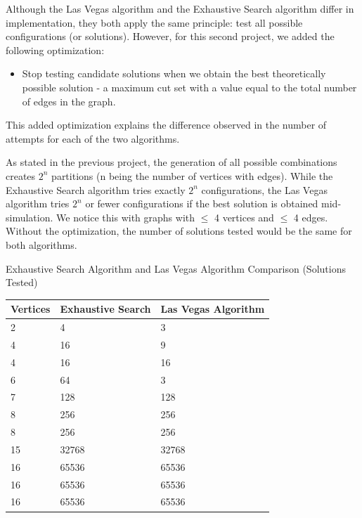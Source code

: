 \documentclass[]{revdetua}
\begin{document}
Although the Las Vegas algorithm and the Exhaustive Search algorithm differ in implementation, they both apply the same principle: test all possible configurations (or solutions). However, for this second project, we added the following optimization:

\begin{itemize}
\item Stop testing candidate solutions when we obtain the best theoretically possible solution - a maximum cut set with a value equal to the total number of edges in the graph.
\end{itemize}

This added optimization explains the difference observed in the number of attempts for each of the two algorithms. 

As stated in the previous project, the generation of all possible combinations creates \(2^n\) partitions (n being the number of vertices with edges). While the Exhaustive Search algorithm tries exactly \(2^n\) configurations, the Las Vegas algorithm tries \(2^n\) or fewer configurations if the best solution is obtained mid-simulation. We notice this with graphs with $\leq$ 4 vertices and $\leq$ 4 edges. Without the optimization, the number of solutions tested would be the same for both algorithms.

\begin{table}[!ht]
    \centering
    Exhaustive Search Algorithm and Las Vegas Algorithm Comparison (Solutions Tested)
    \begin{tabular}{|l|l|l|}
    \hline
        Vertices & Exhaustive Search & Las Vegas Algorithm \\ \hline
        2 & 4 & 3 \\ \hline
        4 & 16 & 9 \\ \hline
        4 & 16 & 16 \\ \hline
        6 & 64 & 3 \\ \hline
        7 & 128 & 128 \\ \hline
        8 & 256 & 256 \\ \hline
        8 & 256 & 256 \\ \hline
        15 & 32768 & 32768 \\ \hline
        16 & 65536 & 65536 \\ \hline
        16 & 65536 & 65536 \\ \hline
        16 & 65536 & 65536 \\ \hline
    \end{tabular}
\end{table}
\end{document}
